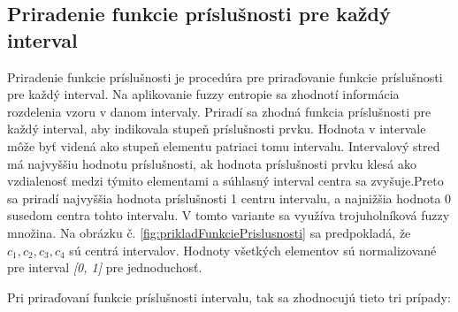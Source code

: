 \subsection{Priradenie funkcie príslušnosti pre každý interval}

Priradenie funkcie príslušnosti je procedúra pre priraďovanie funkcie príslušnosti pre každý interval. Na aplikovanie fuzzy entropie sa zhodnotí informácia rozdelenia vzoru v danom intervaly. Priradí sa zhodná funkcia príslušnosti pre každý interval, aby indikovala stupeň príslušnosti prvku. Hodnota v intervale môže byť videná ako stupeň elementu patriaci tomu intervalu. Intervalový stred má najvyššiu hodnotu príslušnosti, ak hodnota príslušnosti prvku klesá ako vzdialenosť medzi týmito elementami a súhlasný interval centra sa zvyšuje.Preto sa priradí najvyššia hodnota príslušnosti 1 centru intervalu, a najnižšia hodnota 0 susedom centra tohto intervalu. V tomto variante sa využíva trojuholníková fuzzy množina. Na obrázku č. \ref{fig:prikladFunkciePrislusnosti} sa predpokladá, že $c_1, c_2, c_3, c_4$ sú centrá intervalov. Hodnoty všetkých elementov sú normalizované pre interval \textit{[0, 1]} pre jednoduchosť. \cite{lee2001}

Pri priraďovaní funkcie príslušnosti intervalu, tak sa zhodnocujú tieto tri prípady: 

